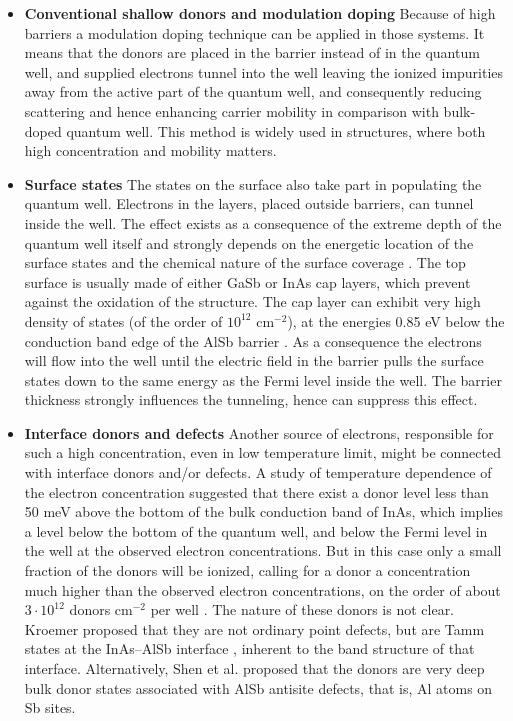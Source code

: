 \documentclass[titlepage,a4paper]{book}
\begin{document}
\begin{itemize}
\item \textbf{Conventional shallow donors and modulation doping} \newline 
Because of high barriers a modulation doping technique can be applied in those systems. It means that the donors are placed in the barrier instead of in the quantum well, and supplied electrons tunnel into the well leaving the ionized impurities away from the active part of the quantum well, and consequently reducing scattering and hence enhancing carrier mobility in comparison with bulk-doped quantum well. This method is widely used in structures, where both high concentration and mobility matters.

\item \textbf{Surface states} \newline
The states on the surface also take part in populating the quantum well. Electrons in the layers, placed outside barriers, can tunnel inside the well. The effect exists as a consequence of the extreme depth of the quantum well itself and strongly depends on the energetic location of the surface states and the chemical nature of the surface coverage \cite{Kroemer_review}. The top surface is usually made of either GaSb or InAs cap layers, which prevent against the oxidation of the structure. The cap layer can exhibit very high density of states (of the order of $10^{12}$ cm$^{-2}$), at the energies 0.85 eV below the conduction band edge of the AlSb barrier \cite{Nguyen_SurfaceDonor}. As a consequence the electrons will flow into the well until the electric field in the barrier pulls the surface states down to the same energy as the Fermi level inside the well. The barrier thickness strongly influences the tunneling, hence can suppress this effect.

\item \textbf{Interface donors and defects} \newline
Another source of electrons, responsible for such a high concentration, even in low temperature limit, might be connected with interface donors and/or defects. A study of temperature dependence of the electron concentration suggested that there exist a donor level less than 50 meV above the bottom of the bulk conduction band of InAs, which implies a level below the bottom of the quantum well, and
below the Fermi level in the well at the observed electron concentrations. But in this case only a small fraction of the donors will be ionized, calling for a donor a concentration much higher than the observed electron concentrations, on the order of about $3 \cdot 10^{12}$ donors cm$^{-2}$ per well \cite{Kroemer_review}. The nature of these donors is not clear. Kroemer proposed that they are not ordinary point defects, but are Tamm states at the InAs–AlSb interface \cite{Kroemer_TammStates}, inherent to the band structure of that interface. Alternatively, Shen et al. \cite{Shen_TammStates} proposed that the donors are very deep bulk donor states associated with AlSb antisite defects, that is, Al atoms on Sb sites.
\end{itemize}
\end{document}
